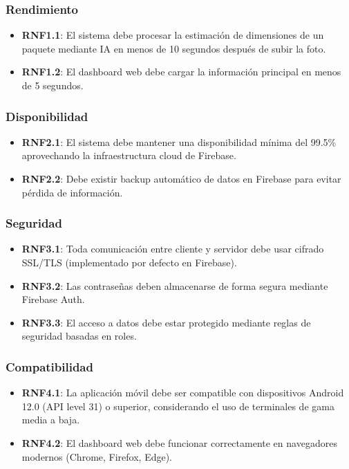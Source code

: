 \subsubsection{Rendimiento}

\begin{itemize}
    \item \textbf{RNF1.1}: El sistema debe procesar la estimación de dimensiones de un paquete mediante IA en menos de 10 segundos después de subir la foto.
    \item \textbf{RNF1.2}: El dashboard web debe cargar la información principal en menos de 5 segundos.
\end{itemize}

\subsubsection{Disponibilidad}

\begin{itemize}
    \item \textbf{RNF2.1}: El sistema debe mantener una disponibilidad mínima del 99.5\% aprovechando la infraestructura cloud de Firebase.
    \item \textbf{RNF2.2}: Debe existir backup automático de datos en Firebase para evitar pérdida de información.
\end{itemize}

\subsubsection{Seguridad}

\begin{itemize}
    \item \textbf{RNF3.1}: Toda comunicación entre cliente y servidor debe usar cifrado SSL/TLS (implementado por defecto en Firebase).
    \item \textbf{RNF3.2}: Las contraseñas deben almacenarse de forma segura mediante Firebase Auth.
    \item \textbf{RNF3.3}: El acceso a datos debe estar protegido mediante reglas de seguridad basadas en roles.
\end{itemize}

\subsubsection{Compatibilidad}

\begin{itemize}
    \item \textbf{RNF4.1}: La aplicación móvil debe ser compatible con dispositivos Android 12.0 (API level 31) o superior, considerando el uso de terminales de gama media a baja.
    \item \textbf{RNF4.2}: El dashboard web debe funcionar correctamente en navegadores modernos (Chrome, Firefox, Edge).
\end{itemize}

